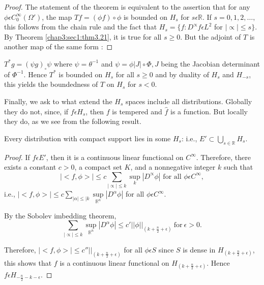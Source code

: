 \begin{proof}
  The statement of the theorem is equivalent to the assertion that for
  any $\phi \epsilon C^\infty_0 (\Omega')$, the map $Tf = (\phi f)
  \circ \phi$ is bounded on $H_s$ for $s \epsilon \mathbb{R}$. If $s
  = 0, 1, 2, \ldots, $ this follows from the chain rule and the fact
  that $H_s =\{ f: D^\propto f \epsilon L^2$ for $|\propto|\leq s \}
  $. By Theorem \ref{chap3:sec1:thm3.21}, it is true for all $s \geq
  0$. But the adjoint of $T$ is another map of the same form :  
\end{proof}

$T^*g = (\psi g)_\circ \psi $ where $\psi = \theta^{-1}$ and $\psi =
\phi |J|\circ \Phi, J $ being the Jacobian determinant of
$\Phi^{-1}$. Hence $T^*$ is bounded on $H_s$ for all $s\geq 0$ and by
duality of $H_s$ and $H_{-s}$, this yields the boundedness of $T$ on $H_s$
for $s < 0$.  

Finally, we ask to what extend the $H_s$ spaces include all
distributions. Globally they do not, since, if $f \epsilon H_s$,
then $f$ is tempered and  $\hat{f}$ is a function. But locally they
do, as we see from the following result.  
	
\setcounter{prop}{23}
\begin{prop}\label{chap3:sec1:prop3.24}%
   Every distribution with compact support lies in some $H_s$:
   i.e., $E' \subset \bigcup\limits_{s \in \mathbb{R}} H_s$. 
\end{prop}	

\begin{proof}
  If $f \epsilon E'$, then it is a continuous linear functional on
  $C^\infty$. Therefore, there exists a constant $c > 0$, a compact set
  $K$, and a nonnegative integer $k$ such that  
  $$
  | < f, \phi >| \leq c \sum_{|\propto|\leq k} \sup_k |D^\propto \phi|
  \text{ for all } \phi \epsilon C^\infty,  
  $$
  i.e., $| < f, \phi > | \le c \sum\limits_{|\alpha| \le | k}
  \sup\limits_{\mathbb{R}^n} |D^{\alpha}\phi|$ for all $\phi \epsilon
  C^{\infty}$.\pageoriginale 
  
  By the Sobolev imbedding theorem, 
  $$
  \sum_{|\propto|\leq k}\sup_{\mathbb{R}^n} |D^{\alpha} \phi| \leq c'
  ||\phi||_{(k+\frac{n}{2}+\epsilon)} ~\text{for}~  \epsilon > 0. 
  $$
  
  Therefore, $|< f, \phi > | \leq c'' ||_{\left(k+\frac{n}{2}+\epsilon\right)}$
  for all $\phi \epsilon S$ since $S$ is dense in
  $H_{(k+\frac{n}{2}+\epsilon)}$, this shows that $f$ is a continuous
  linear functional on $H_{\left(k+\frac{n}{2}+\epsilon\right)}$. Hence $f
  \epsilon H_{-\frac{n}{2}-k-\epsilon}$. 
\end{proof}

